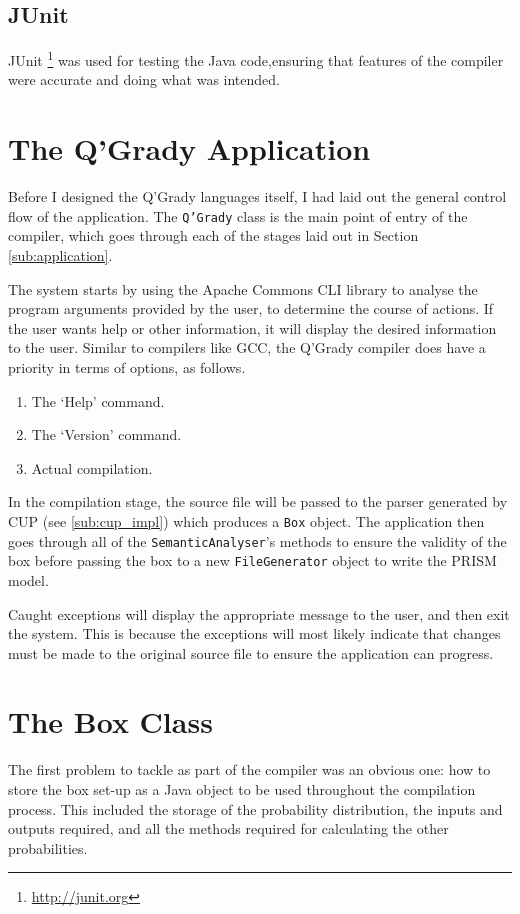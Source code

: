 \documentclass[report.tex]{subfiles}
\begin{document}
\subsection{JUnit} %
\label{sub:junit}
JUnit \footnote{\url{http://junit.org}} was used for testing the Java code,ensuring that features of the compiler were accurate and doing what was
intended.


\section{The Q'Grady Application} %
\label{sec:the_q_grady_application}
Before I designed the Q'Grady languages itself, I had laid out the general
control flow of the application. The \texttt{Q'Grady} class is the main point of
entry of the compiler, which goes through each of the stages laid out in Section
\ref{sub:application}.

The system starts by using the Apache Commons CLI library to analyse the
program arguments provided by the user, to determine the course of actions. If
the user wants help or other information, it will display the desired
information to the user. Similar to compilers like GCC, the Q'Grady compiler
does have a priority in terms of options, as follows.
\begin{enumerate}
    \item The `Help' command.
    \item The `Version' command.
    \item Actual compilation.
\end{enumerate}

In the compilation stage, the source file will be passed to the parser generated
by CUP (see \ref{sub:cup_impl}) which produces a \texttt{Box} object. The
application then goes through all of the \texttt{SemanticAnalyser}'s methods to
ensure the validity of the box before passing the box to a new
\texttt{FileGenerator} object to write the PRISM model. 

Caught exceptions will display the appropriate message to the user, and then
exit the system. This is because the exceptions will most likely indicate that
changes must be made to the original source file to ensure the application can
progress.

\section{The Box Class} %
\label{sec:the_box_class}
The first problem to tackle as part of the compiler was an obvious one: how to
store the box set-up as a Java object to be used throughout the compilation
process. This included the storage of the probability distribution, the inputs
and outputs required, and all the methods required for calculating the other
probabilities.
\end{document}
